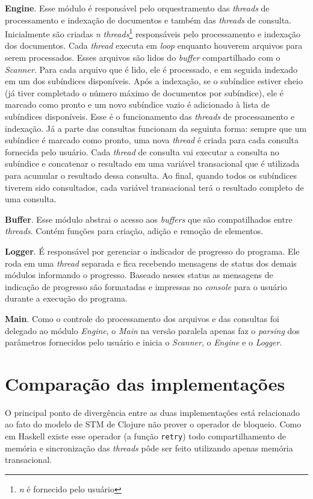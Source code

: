 \textbf{Engine}. Esse módulo é responsável pelo orquestramento das \emph{threads} de processamento e indexação de documentos e também das \emph{threads} de consulta. Inicialmente são criadas \emph{n} \emph{threads}\footnote{\emph{n} é fornecido pelo usuário} responsáveis pelo processamento e indexação dos documentos. Cada \emph{thread} executa em \emph{loop} enquanto houverem arquivos para serem processados. Esses arquivos são lidos do \emph{buffer} compartilhado com o \emph{Scanner}. Para cada arquivo que é lido, ele é processado, e em seguida indexado em um dos subíndices disponíveis. Após a indexação, se o subíndice estiver cheio (já tiver completado o número máximo de documentos por subíndice), ele é marcado como pronto e um novo subíndice vazio é adicionado à lista de subíndices disponíveis. Esse é o funcionamento das \emph{threads} de processamento e indexação. Já a parte das consultas funcionam da seguinta forma: sempre que um subíndice é marcado como pronto, uma nova \emph{thread} é criada para cada consulta fornecida pelo usuário. Cada \emph{thread} de consulta vai executar a consulta no subíndice e concatenar o resultado em uma variável transacional que é utilizada para acumular o resultado dessa consulta. Ao final, quando todos os subíndices tiverem sido consultados, cada variável transacional terá o resultado completo de uma consulta.

\textbf{Buffer}. Esse módulo abstrai o acesso aos \emph{buffers} que são compatilhados entre \emph{threads}. Contém funções para criação, adição e remoção de elementos.

\textbf{Logger}. É responsável por gerenciar o indicador de progresso do programa. Ele roda em uma \emph{thread} separada e fica recebendo mensagens de status dos demais módulos informando o progresso. Baseado nesses status as mensagens de indicação de progresso são formatadas e impressas no \emph{console} para o usuário durante a execução do programa.

\textbf{Main}. Como o controle do processamento dos arquivos e das consultas foi delegado ao módulo \emph{Engine}, o \emph{Main} na versão paralela apenas faz o \emph{parsing} dos parâmetros fornecidos pelo usuário e inicia o \emph{Scanner}, o \emph{Engine} e o \emph{Logger}.


\section{Comparação das implementações}

O principal ponto de divergência entre as duas implementações está relacionado ao fato do modelo de STM de Clojure não prover o operador de bloqueio. Como em Haskell existe esse operador (a função \verb|retry|) todo compartilhamento de memória e sincronização das \emph{threads} pôde ser feito utilizando apenas memória transacional.

